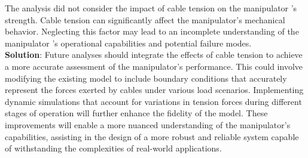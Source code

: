 \begin{itemize}
    The analysis did not consider the impact of cable tension on the manipulator 's strength. Cable tension 
    can significantly affect the manipulator's mechanical behavior. Neglecting this factor may lead to an 
    incomplete understanding of the manipulator 's operational capabilities and potential failure modes. \\
    \textbf{Solution}: Future analyses should integrate the effects of cable tension to achieve a more accurate 
    assessment of the manipulator's performance. This could involve modifying the existing model to include 
    boundary conditions that accurately represent the forces exerted by cables under various load scenarios. 
    Implementing dynamic simulations that account for variations in tension forces during different stages of 
    operation will further enhance the fidelity of the model. These improvements will enable a more nuanced 
    understanding of the manipulator's capabilities, assisting in the design of a more robust and reliable 
    system capable of withstanding the complexities of real-world applications. 
\end{itemize}

